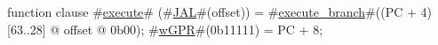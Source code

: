 function clause #\hyperref[zexecute]{execute}# (#\hyperref[zJAL]{JAL}#(offset)) =
  {
    #\hyperref[zexecutezybranch]{execute\_branch}#((PC + 4)[63..28] @ offset @ 0b00);
    #\hyperref[zwGPR]{wGPR}#(0b11111) = PC + 8;
  }
